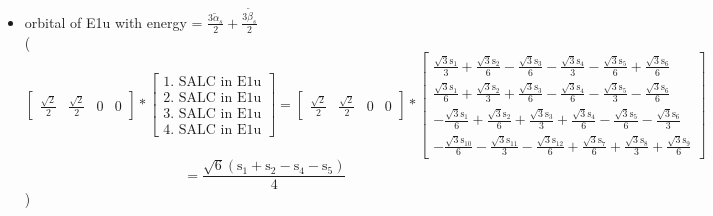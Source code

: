 \documentclass[12pt,a4paper]{article}
\begin{document}
\begin{itemize}
\item orbital of E1u with energy = 
                                $\frac{3 \tilde{\alpha}_{s}}{2} + \frac{3 \tilde{\beta}_{s}}{2}$ \\
( 
$$
\left[\begin{matrix}\frac{\sqrt{2}}{2} & \frac{\sqrt{2}}{2} & 0 & 0\end{matrix}\right] * \left[\begin{array}{c}\text{1. SALC in E1u} \\ \text{2. SALC in E1u} \\ \text{3. SALC in E1u} \\ \text{4. SALC in E1u}\end{array}\right] = \left[\begin{matrix}\frac{\sqrt{2}}{2} & \frac{\sqrt{2}}{2} & 0 & 0\end{matrix}\right] * \left[\begin{matrix}\frac{\sqrt{3} \text{s}_{1}}{3} + \frac{\sqrt{3} \text{s}_{2}}{6} - \frac{\sqrt{3} \text{s}_{3}}{6} - \frac{\sqrt{3} \text{s}_{4}}{3} - \frac{\sqrt{3} \text{s}_{5}}{6} + \frac{\sqrt{3} \text{s}_{6}}{6}\\\frac{\sqrt{3} \text{s}_{1}}{6} + \frac{\sqrt{3} \text{s}_{2}}{3} + \frac{\sqrt{3} \text{s}_{3}}{6} - \frac{\sqrt{3} \text{s}_{4}}{6} - \frac{\sqrt{3} \text{s}_{5}}{3} - \frac{\sqrt{3} \text{s}_{6}}{6}\\- \frac{\sqrt{3} \text{s}_{1}}{6} + \frac{\sqrt{3} \text{s}_{2}}{6} + \frac{\sqrt{3} \text{s}_{3}}{3} + \frac{\sqrt{3} \text{s}_{4}}{6} - \frac{\sqrt{3} \text{s}_{5}}{6} - \frac{\sqrt{3} \text{s}_{6}}{3}\\- \frac{\sqrt{3} \text{s}_{10}}{6} - \frac{\sqrt{3} \text{s}_{11}}{3} - \frac{\sqrt{3} \text{s}_{12}}{6} + \frac{\sqrt{3} \text{s}_{7}}{6} + \frac{\sqrt{3} \text{s}_{8}}{3} + \frac{\sqrt{3} \text{s}_{9}}{6}\end{matrix}\right] 
 $$ $$ = \frac{\sqrt{6} \left(\text{s}_{1} + \text{s}_{2} - \text{s}_{4} - \text{s}_{5}\right)}{4} 
 $$ 
 )


\end{itemize}
\end{document}
